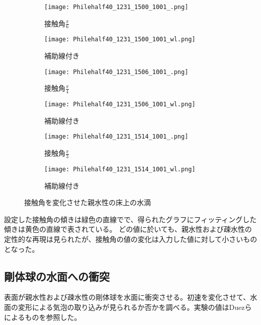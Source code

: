 \documentclass[]{jsarticle}
\begin{document}
\begin{figure}[H]
  \centering
  \begin{subfigure}{0.4\columnwidth}
    \centering
    \texttt{[image: Philehalf40\_1231\_1500\_1001\_.png]}
    \caption{接触角$\frac{\pi}{6}$}
    \label{fig:phile_pi6}
  \end{subfigure}
  \begin{subfigure}{0.4\columnwidth}
    \centering
    \texttt{[image: Philehalf40\_1231\_1500\_1001\_wl.png]}
    \caption{補助線付き}
    \label{fig:phile_pi6wl}
  \end{subfigure}

  \begin{subfigure}{0.4\columnwidth}
    \centering
    \texttt{[image: Philehalf40\_1231\_1506\_1001\_.png]}
    \caption{接触角$\frac{\pi}{4}$}
    \label{fig:phile_pi4}
  \end{subfigure}
  \begin{subfigure}{0.4\columnwidth}
    \centering
    \texttt{[image: Philehalf40\_1231\_1506\_1001\_wl.png]}
    \caption{補助線付き}
    \label{fig:phile_pi4wl}
  \end{subfigure}
  \begin{subfigure}{0.4\columnwidth}
    \centering
    \texttt{[image: Philehalf40\_1231\_1514\_1001\_.png]}
    \caption{接触角$\frac{\pi}{3}$}
    \label{fig:phile_pi3}
  \end{subfigure}
  \begin{subfigure}{0.4\columnwidth}
    \centering
    \texttt{[image: Philehalf40\_1231\_1514\_1001\_wl.png]}
    \caption{補助線付き}
    \label{fig:phile_pi3wl}
  \end{subfigure}

  \caption{接触角を変化させた親水性の床上の水滴}
\end{figure}

設定した接触角の傾きは緑色の直線でで、得られたグラフにフィッティングした傾きは黄色の直線で表されている。
どの値に於いても、親水性および疎水性の定性的な再現は見られたが、接触角の値の変化は入力した値に対して小さいものとなった。

\newpage
\subsection{剛体球の水面への衝突}
表面が親水性および疎水性の剛体球を水面に衝突させる。初速を変化させて、水面の変形による気泡の取り込みが見られるか否かを調べる。実験の値はDuez\cite{Duez2007}らによるものを参照した。
\end{document}
